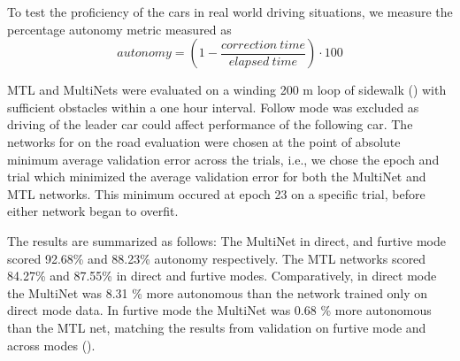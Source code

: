 To test the proficiency of the cars in real world driving situations, we measure the percentage autonomy metric \cite{bojarski2016end} measured as
\begin{equation}
    autonomy = (1 - \dfrac{correction\ time}{elapsed\ time}) \cdot 100
   \label{eq:autonomy}
\end{equation}

MTL and MultiNets were evaluated on a winding 200 m loop of sidewalk () with sufficient obstacles within a one hour interval. Follow mode was excluded as driving of the leader car could affect performance of the following car. The networks for on the road evaluation were chosen at the point of absolute minimum average validation error across the trials, i.e., we chose the epoch and trial which minimized the average validation error for both the MultiNet and MTL networks. This minimum occured at epoch 23 on a specific trial, before either network began to overfit. 

The results are summarized as follows: The MultiNet in direct, and furtive mode scored 92.68\% and 88.23\% autonomy respectively. The MTL networks scored 84.27\% and 87.55\% in direct and furtive modes. Comparatively, in direct mode the MultiNet was 8.31 \% more autonomous than the network trained only on direct mode data. In furtive mode the MultiNet was 0.68 \% more autonomous than the MTL net, matching the results from validation on furtive mode and across modes ().
